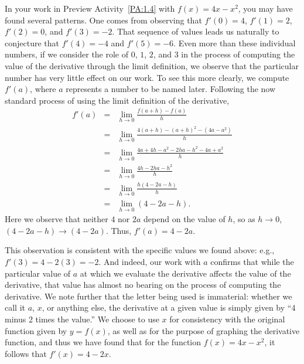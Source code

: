 In your work in Preview Activity~\ref{PA:1.4} with $f(x) = 4x - x^2$, you may have found several patterns.  One comes from observing that $f'(0) = 4$, $f'(1) = 2$, $f'(2) = 0$, and $f'(3) = -2$.  That sequence of values leads us naturally to conjecture that $f'(4) = -4$ and $f'(5) = -6.$  Even more than these individual numbers, if we consider the role of $0$, $1$, $2$, and $3$ in the process of computing the value of the derivative through the limit definition, we observe that the particular number has very little effect on our work.  To see this more clearly, we compute $f'(a)$, where $a$ represents a number to be named later.  Following the now standard process of using the limit definition of the derivative, 
\begin{eqnarray*}
	f'(a) & = & \lim_{h \to 0} \frac{f(a + h) - f(a)}{h} \\
		  & = & \lim_{h \to 0} \frac{4(a + h) - (a + h)^2 - (4a-a^2)}{h} \\
		  & = & \lim_{h \to 0} \frac{4a + 4h - a^2 - 2ha - h^2 - 4a+a^2}{h} \\
		   & = & \lim_{h \to 0} \frac{4h - 2ha - h^2}{h} \\
		   & = & \lim_{h \to 0} \frac{h(4 - 2a - h)}{h} \\
		   & = & \lim_{h \to 0} (4 - 2a - h).
\end{eqnarray*}
Here we observe that neither $4$ nor $2a$ depend on the value of $h$, so as $h \to 0$, $(4 - 2a - h) \to (4 - 2a)$.  Thus, $f'(a) = 4 - 2a$.

This observation is consistent with the specific values we found above:  e.g., $f'(3) = 4 - 2(3) = -2$.  And indeed, our work with $a$ confirms that while the particular value of $a$ at which we evaluate the derivative affects the value of the derivative, that value has almost no bearing on the process of computing the derivative.   We note further that the letter being used is immaterial:  whether we call it $a$, $x$, or anything else, the derivative at a given value is simply given by ``4 minus 2 times the value.''  We choose to use $x$ for consistency with the original function given by $y = f(x)$, as well as for the purpose of graphing the derivative function, and thus we have found that for the function $f(x) = 4x - x^2$, it follows that $f'(x) = 4 - 2x.$

